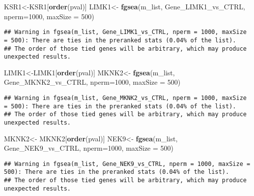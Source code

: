 \documentclass[]{article}
\newenvironment{Shaded}{\begin{snugshade}}{\end{snugshade}}
\newcommand{\KeywordTok}[1]{\textcolor[rgb]{0.13,0.29,0.53}{\textbf{#1}}}
\newcommand{\DataTypeTok}[1]{\textcolor[rgb]{0.13,0.29,0.53}{#1}}
\newcommand{\DecValTok}[1]{\textcolor[rgb]{0.00,0.00,0.81}{#1}}
\newcommand{\StringTok}[1]{\textcolor[rgb]{0.31,0.60,0.02}{#1}}
\newcommand{\NormalTok}[1]{#1}
\begin{document}
\begin{Shaded}
\begin{Highlighting}[]
\NormalTok{KSR1<-KSR1[}\KeywordTok{order}\NormalTok{(pval)]}
\NormalTok{LIMK1<-}\StringTok{ }\KeywordTok{fgsea}\NormalTok{(m_list, Gene_LIMK1_vs_CTRL, }\DataTypeTok{nperm=}\DecValTok{1000}\NormalTok{, }\DataTypeTok{maxSize =} \DecValTok{500}\NormalTok{)}
\end{Highlighting}
\end{Shaded}

\begin{verbatim}
## Warning in fgsea(m_list, Gene_LIMK1_vs_CTRL, nperm = 1000, maxSize = 500): There are ties in the preranked stats (0.04% of the list).
## The order of those tied genes will be arbitrary, which may produce unexpected results.
\end{verbatim}

\begin{Shaded}
\begin{Highlighting}[]
\NormalTok{LIMK1<-LIMK1[}\KeywordTok{order}\NormalTok{(pval)]}
\NormalTok{MKNK2<-}\StringTok{ }\KeywordTok{fgsea}\NormalTok{(m_list, Gene_MKNK2_vs_CTRL, }\DataTypeTok{nperm=}\DecValTok{1000}\NormalTok{, }\DataTypeTok{maxSize =} \DecValTok{500}\NormalTok{)}
\end{Highlighting}
\end{Shaded}

\begin{verbatim}
## Warning in fgsea(m_list, Gene_MKNK2_vs_CTRL, nperm = 1000, maxSize = 500): There are ties in the preranked stats (0.04% of the list).
## The order of those tied genes will be arbitrary, which may produce unexpected results.
\end{verbatim}

\begin{Shaded}
\begin{Highlighting}[]
\NormalTok{MKNK2<-}\StringTok{ }\NormalTok{MKNK2[}\KeywordTok{order}\NormalTok{(pval)]}
\NormalTok{NEK9<-}\StringTok{ }\KeywordTok{fgsea}\NormalTok{(m_list, Gene_NEK9_vs_CTRL, }\DataTypeTok{nperm=}\DecValTok{1000}\NormalTok{, }\DataTypeTok{maxSize =} \DecValTok{500}\NormalTok{)}
\end{Highlighting}
\end{Shaded}

\begin{verbatim}
## Warning in fgsea(m_list, Gene_NEK9_vs_CTRL, nperm = 1000, maxSize = 500): There are ties in the preranked stats (0.04% of the list).
## The order of those tied genes will be arbitrary, which may produce unexpected results.
\end{verbatim}
\end{document}
